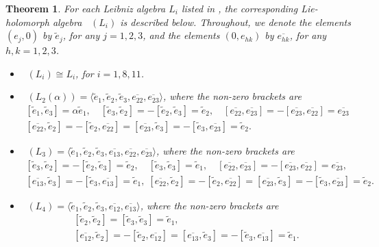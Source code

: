 \documentclass[11pt,a4paper]{amsart}
\theoremstyle{plain}
\newtheorem{theorem}[subsection]{Theorem}
\theoremstyle{definition}
\theoremstyle{remark}
\numberwithin{equation}{section}
\newcommand{\0}{\emptyset}
\DeclareMathOperator{\holL}{hol_{Lie}}
\newcommand{\ov}[1]{\overline{#1}}
\begin{document}
\begin{theorem}\label{theorem:3_dim_Lie_holomorphs} For each Leibniz algebra $L_i$ listed in , 
	the corresponding Lie-holomorph algebra $\holL(L_i)$ is described below. Throughout, we denote the elements $(e_j,0)$ by $\widetilde{e}_j$, for any $j=1,2,3$, and the elements $(0,e_{hk})$ by $\ov{e_{hk}}$, for any $h,k=1,2,3$.
	\begin{itemize}[itemsep=0.35em]
		\item  $\holL(L_i) \cong L_i$, for $i=1,8,11$.
		\item  $\holL(L_2(\alpha))=\langle \widetilde{e}_1,\widetilde{e}_2,\widetilde{e}_3,\ov{e_{22}},\ov{e_{23}}\rangle$, where the non-zero brackets are
		      \begin{gather*}
		      	\left[\widetilde{e}_1,\widetilde{e}_3\right]=\alpha\widetilde{e}_1,\quad
		      	\left[\widetilde{e}_3,\widetilde{e}_2\right]=-\left[\widetilde{e}_2,\widetilde{e}_3\right]=\widetilde{e}_2,\quad
		      	\left[\ov{e_{22}},\ov{e_{23}}\right]=-\left[\ov{e_{23}},\ov{e_{22}}\right]=\ov{e_{23}} \\
		      	\left[\ov{e_{22}},\widetilde{e}_2\right]=-\left[\widetilde{e}_2,\ov{e_{22}}\right]=
		      	\left[\ov{e_{23}},\widetilde{e}_3\right]=-\left[\widetilde{e}_3,\ov{e_{23}}\right]=\widetilde{e}_2.
		      \end{gather*}
		      
		\item  $\holL(L_3)=\langle \widetilde{e}_1,\widetilde{e}_2,\widetilde{e}_3,\ov{e_{13}},\ov{e_{22}},\ov{e_{23}}\rangle$, where the non-zero brackets are
		      \begin{gather*}
		      \left[\widetilde{e}_3,\widetilde{e}_2\right] = -\left[\widetilde{e}_2,\widetilde{e}_3\right] = \widetilde{e}_2, \quad
		      	\left[\widetilde{e}_3,\widetilde{e}_3\right] =\widetilde{e}_1, \quad
                \left[\ov{e_{22}},\ov{e_{23}}\right] = -\left[\ov{e_{23}},\ov{e_{22}}\right] = \ov{e_{23}},\\
		      	\left[\ov{e_{13}},\widetilde{e}_3\right] = -\left[\widetilde{e}_3,\ov{e_{13}}\right] = \widetilde{e}_1, \;
		      	\left[\ov{e_{22}},\widetilde{e}_2\right] = -\left[\widetilde{e}_2,\ov{e_{22}}\right] =\left[\ov{e_{23}},\widetilde{e}_3\right] = -\left[\widetilde{e}_3,\ov{e_{23}}\right] = \widetilde{e}_2.
		      \end{gather*}
		    
		\item  $\holL(L_4)=\langle \widetilde{e}_1,\widetilde{e}_2,\widetilde{e}_3,\ov{e_{12}},\ov{e_{13}} \rangle$, where the non-zero brackets are
		      \begin{gather*}
		      	\left[\widetilde{e}_2,\widetilde{e}_2\right] =\left[\widetilde{e}_3,\widetilde{e}_3\right]=\widetilde{e}_1,\\
		      	\left[\ov{e_{12}},\widetilde{e}_2\right] = -\left[\widetilde{e}_2,\ov{e_{12}}\right] = 
		      	\left[\ov{e_{13}},\widetilde{e}_3\right] = -\left[\widetilde{e}_3,\ov{e_{13}}\right] = \widetilde{e}_1.
		      \end{gather*}
		      

\end{itemize}
\end{theorem}
\end{document}
